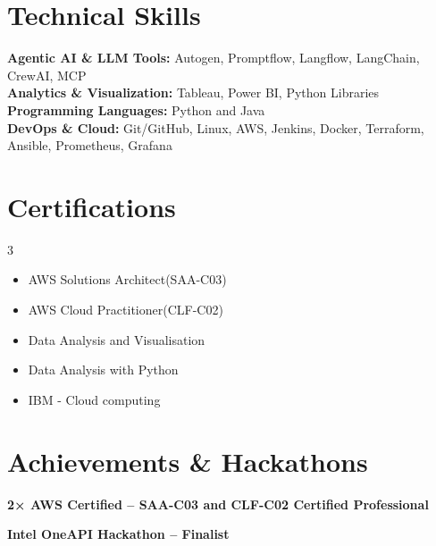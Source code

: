 \documentclass[letterpaper,11pt]{article}
\newcommand{\resumeSubHeadingListStart}{\begin{itemize}[leftmargin=0.0in, label={}]}
\newcommand{\resumeSubHeadingListEnd}{\end{itemize}}
\begin{document}
%
\section{Technical Skills}
\small{

\textbf{Agentic AI \& LLM Tools:} Autogen, Promptflow, Langflow, LangChain, CrewAI, MCP \\
\textbf{Analytics \& Visualization:} Tableau, Power BI, Python Libraries \\
\textbf{Programming Languages:} Python and Java\\
\textbf{DevOps \& Cloud:} Git/GitHub, Linux, AWS, Jenkins, Docker, Terraform, Ansible, Prometheus, Grafana \\

}
\vspace{-10pt}

\section{Certifications}
        \begin{multicols}{3}
            \begin{itemize}[itemsep=-5pt, parsep=3pt]
                \item\small AWS Solutions Architect(SAA-C03)
                \item AWS Cloud Practitioner(CLF-C02)
                \item Data Analysis and Visualisation
                \item Data Analysis with Python
                \item IBM - Cloud computing
            \end{itemize}
        \end{multicols}
        \vspace*{2.0\multicolsep}
\section{Achievements \& Hackathons}
\vspace{2pt}
\begin{itemize}[leftmargin=0.15in, itemsep=2pt, topsep=0pt]
\small{
    \item \textbf{2× AWS Certified – SAA-C03 and CLF-C02 Certified Professional}
    
    \item \textbf{Intel OneAPI Hackathon – Finalist}
}
\end{itemize}
\vspace{-19pt}
\end{document}
